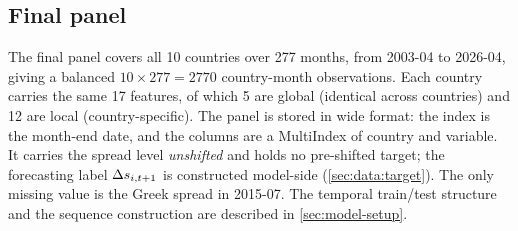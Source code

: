 \subsection{Final panel}
\label{sec:data:panel}
The final panel covers all 10 countries over 277 months, from 2003-04 to
2026-04, giving a balanced $10 \times 277 = 2770$ country-month observations.
Each country carries the same 17 features, of which 5 are global (identical
across countries) and 12 are local (country-specific). The panel is stored in
wide format: the index is the month-end date, and the columns are a MultiIndex
of country and variable. It carries the spread level \emph{unshifted} and holds
no pre-shifted target; the forecasting label $\Delta s_{i,t+1}$ is constructed
model-side (\cref{sec:data:target}). The only missing value is the Greek spread
in 2015-07. The temporal train/test structure and the sequence construction are
described in \cref{sec:model-setup}.


